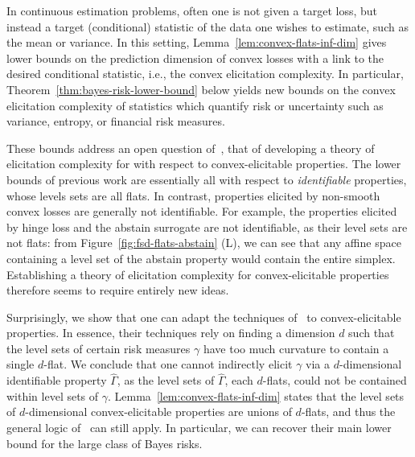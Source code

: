 \documentclass[anon,12pt]{colt2021} %
\newcommand{\R}{\mathcal{R}}
\newcommand{\ones}{\mathbbm{1}}
\begin{document}
In continuous estimation problems, often one is not given a target loss, but instead a target (conditional) statistic of the data one wishes to estimate, such as the mean or variance.
In this setting, Lemma~\ref{lem:convex-flats-inf-dim} gives lower bounds on the prediction dimension of convex losses with a link to the desired conditional statistic, i.e., the convex elicitation complexity.
In particular,
Theorem~\ref{thm:bayes-risk-lower-bound} below yields new bounds on the convex elicitation complexity of statistics which quantify risk or uncertainty such as variance, entropy, or financial risk measures.

These bounds address an open question of~\citet{frongillo2020elicitation}, that of developing a theory of elicitation complexity for with respect to convex-elicitable properties.
The lower bounds of previous work are essentially all with respect to \emph{identifiable} properties, whose levels sets are all flats.
In contrast, properties elicited by non-smooth convex losses are generally not identifiable.
For example, the properties elicited by hinge loss and the abstain surrogate are not identifiable, as their level sets are not flats: from Figure~\ref{fig:fsd-flats-abstain} (L), we can see that any affine space containing a level set of the abstain property would contain the entire simplex.
Establishing a theory of elicitation complexity for convex-elicitable properties therefore seems to require entirely new ideas.

Surprisingly, we show that one can adapt the techniques of~\citet{frongillo2020elicitation} to convex-elicitable properties.
In essence, their techniques rely on finding a dimension $d$ such that the level sets of certain risk measures $\gamma$ have too much curvature to contain a single $d$-flat.
We conclude that one cannot indirectly elicit $\gamma$ via a $d$-dimensional identifiable property $\hat\Gamma$, as the level sets of $\hat\Gamma$, each $d$-flats, could not be contained within level sets of $\gamma$.
Lemma~\ref{lem:convex-flats-inf-dim} states that the level sets of $d$-dimensional convex-elicitable properties are unions of $d$-flats, and thus the general logic of~\citet{frongillo2020elicitation} can still apply.
In particular, we can recover their main lower bound for the large class of Bayes risks.
\end{document}

